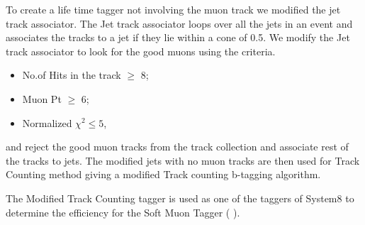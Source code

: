 To create a life time tagger not involving the muon track we modified 
the jet track associator. The Jet track associator  loops over all the jets 
in an event and associates the tracks to a jet if they lie within a cone of 
0.5. We modify the Jet track associator to look for the good muons using the
criteria.
\begin{itemize} 
\item   No.of Hits in the track $ \ge $ 8;
\item   Muon Pt $ \ge $ 6;
\item   Normalized $\chi^{2} \le 5$,
\end{itemize}   
and reject the good muon tracks from the track collection and associate rest 
of the tracks to jets. The modified jets with no muon tracks are then used 
for Track Counting method giving a modified Track counting b-tagging algorithm.

The Modified Track Counting tagger is used as one of the taggers of System8 
to determine the efficiency for the Soft Muon Tagger ( \ptrel).



